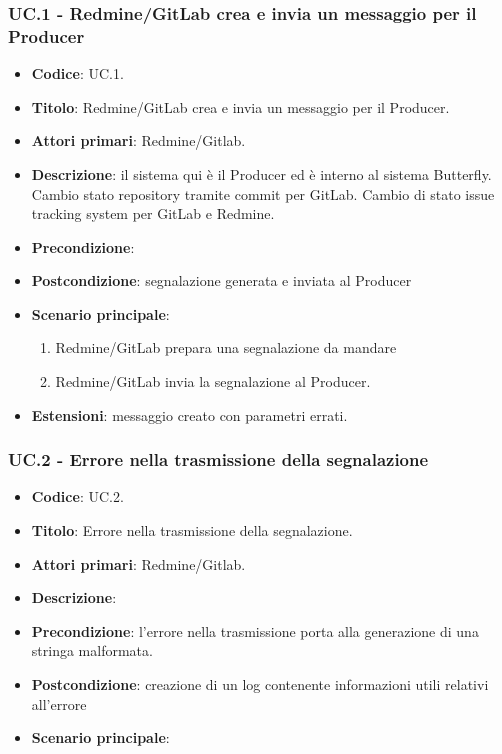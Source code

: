 \subsubsection{UC\theuccount.1 - Redmine/GitLab crea e invia un messaggio per il Producer}
	\begin{itemize}
		\item \textbf{Codice}: UC\theuccount.1.
		\item \textbf{Titolo}: Redmine/GitLab crea e invia un messaggio per il Producer.
		\item \textbf{Attori primari}: Redmine/Gitlab.
		\item \textbf{Descrizione}:
		il sistema qui è il Producer ed è interno al sistema Butterfly. Cambio stato repository tramite commit per GitLab. Cambio di stato issue tracking system per GitLab e Redmine.
		\item \textbf{Precondizione}: 
		\item \textbf{Postcondizione}: segnalazione generata e inviata al Producer
		\item \textbf{Scenario principale}: 
		\begin{enumerate}
			\item Redmine/GitLab prepara una segnalazione da mandare
			\item Redmine/GitLab invia la segnalazione al Producer.
		\end{enumerate}
		\item \textbf{Estensioni}: messaggio creato con parametri errati.
	\end{itemize}


\subsubsection{UC\theuccount.2 - Errore nella trasmissione della segnalazione}
	\begin{itemize}
		\item \textbf{Codice}: UC\theuccount.2.
		\item \textbf{Titolo}: Errore nella trasmissione della segnalazione.
		\item \textbf{Attori primari}: Redmine/Gitlab.
		\item \textbf{Descrizione}:
		\item \textbf{Precondizione}: l'errore nella trasmissione porta alla generazione di una stringa malformata.
		\item \textbf{Postcondizione}: creazione di un log contenente informazioni utili relativi all'errore
		\item \textbf{Scenario principale}: 
	\end{itemize}

